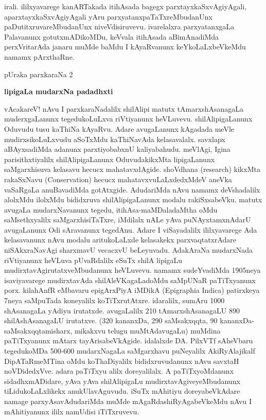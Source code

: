 \documentclass[11pt,a4size]{article}
\begin{document}
irali. ililxyavarege kanARTakada itihAsada bagegx
parxtayxkaSxvAgiyAgali, aparxtayxkaSxvAgiyAgali yAru
parxyatanxpaTaTxreMbudanUnx paDutitxruvareMbudanUnx
niveVdisiruvevu. ivarelalxra parxyatanxgaLa Palavanunx
gotutxmADikoMDu, keVvala itihAsada aBimAnadiMda perxVritarAda janaru
muMde baMdu I kAyaRvanunx keYkoLaLxbeVkeMdu namamx pArxthaRne.

\newpage

\begin{center}
{\Huge pUraka parxkaraNa 2}

\smallskip
\textbf{\LARGE lipigaLa mudarxNa padadhxti}
\end{center}

vAcakareV! nAvu I parxkaraNadalilx shilAlipi matutx tAmarxshAsanagaLa
muderxgaLanunx tegedukoLuLxva riVtiyanunx heVLuvevu. shilAlipigaLanunx
Oduvudu tusu kaThiNa kAyaRvu. Adare avugaLanunx kAgadada meVle
mudirxsikoLuLxvudu aSoTxMdu kaThiNavAda kelasavalalx. savxlapx
aBAyxsadiMda adanunx parxtiyobabxnU kaliyabahudu. meVlAgi, Igina
parisithxtiyalilx shilAlipigaLanunx OduvudakikxMta lipigaLanunx
saMgarxhisuva kelasavu hecucx mahatavxdAgide. shoVdhana
{\rm (research)} kikxMta rakaSxNavu {\rm
    (Conservation)} hecucx mahatavxvuLaLxdedxMdeV aneVka vaSaRgaLa
anuBavadiMda gotAtxgide. AdudariMda nAvu namamx deVshadalilx alolxMdu
ilolxMdu bididxruva shilAlipigaLanunx modalu rakiSxsabeVku. matutx
avugaLa mudarxNavanunx tegedu, itihAsa-maMDaladaMtha oMdu
saMsethxyalilx saMgarxhisiTaTxre, iMdilalx nALe yAva puNAyxtamxnAdarU
avugaLanunx Odi sAravanunx tegedAnu. Adare I viSayadalilx
ililxyavarege Ada kelasavanunx nAvu modalu aritukoLaLxde kelasakekx
parxvaqtatxrAdare niSAkxraNavAgi sharxmavU vecacxvU
beLeyuvadu. AdakAraNa mudarxNada riVtiyanunx heVLuva pUvaRdalilx eSuTx
shilA lipigaLu mudirxtavAgirutatxveMbudanunx heVLuvevu. namamx
sudeYvadiMda 1905neya isaviyavarege mudirxtavAda shilAleVKagaLadoMdu
saMpUNaR paTiTxyanunx porx. kilahAnfR eMbavaru epigArxPiyA iMDikA
{\rm (Epigraphia Indica)}  patirxkeya 7neya saMpuTada
koneyalilx koTiTxrutAtxre. idaralilx, sumAru 1000 shAsanagaLa yAdiyu
irutatxde. avugaLalilx 210 tAmarxshAsanagaLU 890 shilAshAsanagaLU
irutatxve. (320 kananxDa, 290 saMsakxqqta, 90
kananxDa-saMsakxqqtamisharx, mikakxvu telugu muMtAdavugaLu) muMdina
paTiTxyanunx mAtarx tayArisabeVkAgide. idalalxde DA. PilxVTf sAheVbaru
tegedukoMDa 500-600 mudarxNagaLa saMgarxhavu puNeyalilx AkiRyAlajikalf
DipATaRmeMTina oMdu koThaDiyalilx bididxruvudanunx nAvu savxtaH
noVDidedxVve. adara paTiTxyu alilx doreyalilalx. A paTiTxyoMdanunx
sidadhxmADidare, yAva yAva shilAlipigaLu mudirxtavAgiveyeMbudanunx
tiLidukoLaLxlikekx anukUlavAguvudu. iSuTx mAhitiyu doreyabeVkAdare
namage parxyAsavAdudariMda muMde mAgaRdashiRyAgabeVkeMdu nAvu I
mAhitiyanunx ililx namUdisi iTiTxruvevu.
\end{document}

